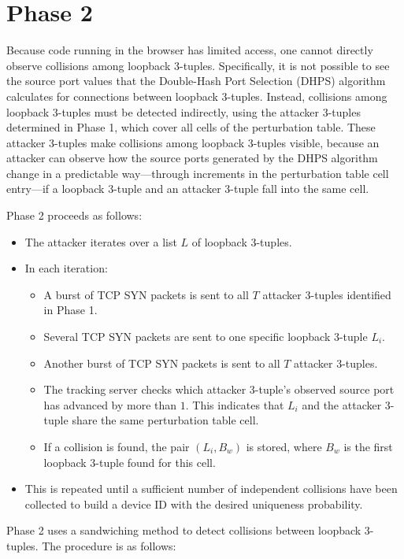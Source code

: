 \documentclass{report}
\begin{document}
\section{Phase 2}
\label{sec:phase 2}

Because code running in the browser has limited access, one cannot directly observe collisions among loopback 3-tuples. Specifically, it is not possible to see the source port values that the Double-Hash Port Selection (DHPS) algorithm calculates for connections between loopback 3-tuples. Instead, collisions among loopback 3-tuples must be detected indirectly, using the attacker 3-tuples determined in Phase 1, which cover all cells of the perturbation table. These attacker 3-tuples make collisions among loopback 3-tuples visible, because an attacker can observe how the source ports generated by the DHPS algorithm change in a predictable way—through increments in the perturbation table cell entry—if a loopback 3-tuple and an attacker 3-tuple fall into the same cell.

Phase 2 proceeds as follows:

\begin{itemize}
	\item The attacker iterates over a list $L$ of loopback 3-tuples.
	\item In each iteration:
	\begin{itemize}
		\item A burst of TCP SYN packets is sent to all $T$ attacker 3-tuples identified in Phase 1.
		\item Several TCP SYN packets are sent to one specific loopback 3-tuple $L_i$.
		\item Another burst of TCP SYN packets is sent to all $T$ attacker 3-tuples.
		\item The tracking server checks which attacker 3-tuple’s observed source port has advanced by more than $1$. This indicates that $L_i$ and the attacker 3-tuple share the same perturbation table cell.
		\item If a collision is found, the pair $(L_i, B_w)$ is stored, where $B_w$ is the first loopback 3-tuple found for this cell.
	\end{itemize}
	\item This is repeated until a sufficient number of independent collisions have been collected to build a device ID with the desired uniqueness probability.
\end{itemize}

Phase 2 uses a \alert{sandwiching method} to detect collisions between loopback 3-tuples. The procedure is as follows:
\end{document}
